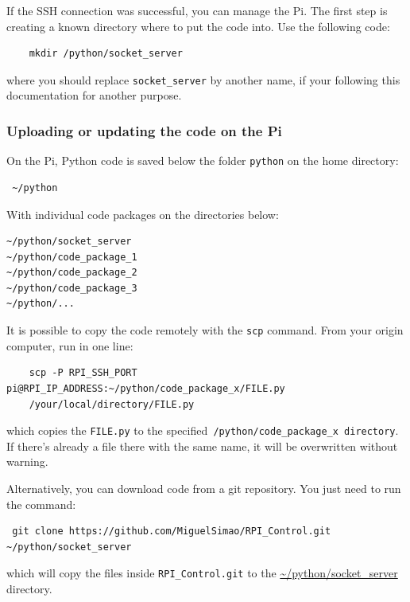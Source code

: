 \documentclass[twoside,a4paper]{refart}
\begin{document}
If the SSH connection was successful, you can manage the Pi. The first step is creating a known directory where to put the code into. Use the following code:

\begin{verbatim}
	mkdir /python/socket_server
\end{verbatim}
where you should replace {\tt socket\_server} by another name, if your following this documentation for another purpose.

\subsubsection{Uploading or updating the code on the Pi}
On the Pi, Python code is saved below the folder {\tt python} on the home directory:
\begin{verbatim} ~/python \end{verbatim}
With individual code packages on the directories below:
\begin{verbatim}
~/python/socket_server
~/python/code_package_1
~/python/code_package_2
~/python/code_package_3
~/python/...
\end{verbatim}

 It is possible to copy the code remotely with the {\tt scp} command. From your origin computer, run in one line:
\begin{verbatim}
	scp -P RPI_SSH_PORT pi@RPI_IP_ADDRESS:~/python/code_package_x/FILE.py
	/your/local/directory/FILE.py
\end{verbatim}
which copies the {\tt FILE.py} to the specified{\tt ~/python/code\_package\_x directory}. \attention If there's already a file there with the same name, it will be overwritten without warning.

Alternatively, you can download code from a git repository\footnotemark. You just need to run the command:

\begin{verbatim} git clone https://github.com/MiguelSimao/RPI_Control.git
~/python/socket_server
\end{verbatim}
which will copy the files inside {\tt RPI\_Control.git} to the \url{~/python/socket\_server} directory.

\end{document}
